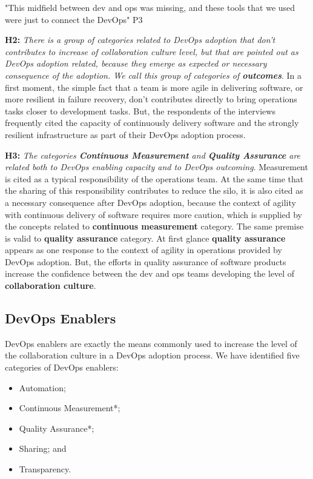 "This midfield between dev and ops was missing, and these tools that we used were just to connect the DevOps" P3

\textbf{H2:} \textit{There is a group of categories related to DevOps adoption that don't contributes to increase of collaboration culture level, but that are pointed out as DevOps adoption related, because they emerge as expected or necessary consequence of the adoption. We call this group of categories of \textbf{outcomes}}. In a first moment, the simple fact that a team is more agile in delivering software, or more resilient in failure recovery, don't contributes directly to bring operations tasks closer to development tasks. But, the respondents of the interviews frequently cited the capacity of continuously delivery software and the strongly resilient infrastructure as part of their DevOps adoption process.

\textbf{H3:} \textit{The categories \textbf{Continuous Measurement} and \textbf{Quality Assurance} are related both to DevOps enabling capacity and to DevOps outcoming}. Measurement is cited as a typical responsibility of the operations team. At the same time that the sharing of this responsibility contributes to reduce the silo, it is also cited as a necessary consequence after DevOps adoption, because the context of agility with continuous delivery of software requires more caution, which is supplied by the concepts related to \textbf{continuous measurement} category. The same premise is valid to \textbf{quality assurance} category. At first glance \textbf{quality assurance} appears as one response to the context of agility in operations provided by DevOps adoption. But, the efforts in quality assurance of software products increase the confidence between the dev and ops teams developing the level of \textbf{collaboration culture}.

\subsection{DevOps Enablers}

DevOps enablers are exactly the means commonly used to increase the level of the collaboration culture in a DevOps adoption process. We have identified five categories of DevOps enablers:

\begin{itemize}
\item Automation;
\item Continuous Measurement*;
\item Quality Assurance*;
\item Sharing; and
\item Transparency.
\end{itemize}

